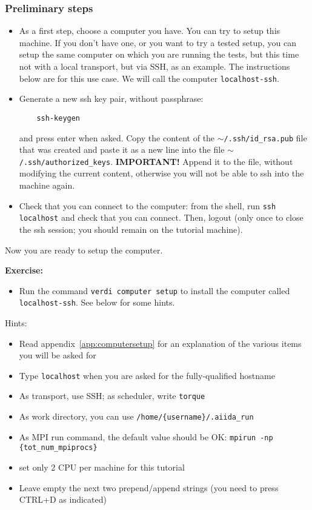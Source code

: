 \subsubsection*{Preliminary steps}
\begin{itemize}
\item As a first step, choose a computer you have. You can try to setup this machine.
If you don't have one, or you want to try a tested setup, you can setup the same computer on which
you are running the tests, but this time not with a local transport, but via SSH, as an example. The instructions below are for this use case. We will call the computer \texttt{localhost-ssh}.

\item Generate a new ssh key pair, without passphrase:
\begin{verbatim}
    ssh-keygen
\end{verbatim}
and press enter when asked. 
Copy the content of the \texttt{$\sim$/.ssh/id\_rsa.pub} file that was created and 
paste it as a new line into the file \texttt{$\sim$/.ssh/authorized\_keys}. \textbf{IMPORTANT!}
Append it to the file, without modifying the current content, otherwise you will 
not be able to ssh into the machine again.

\item Check that you can connect to the computer: from the shell, run \texttt{ssh localhost} and check that you can connect. Then, logout (only once to close the ssh session;
you should remain on the tutorial machine).
\end{itemize}

Now you are ready to setup the computer.

\begin{tcolorbox}
\textbf{Exercise:}
\begin{itemize}
\item Run the command \texttt{verdi computer setup} to install the computer called \texttt{localhost-ssh}. See below for some hints.
\end{itemize}
\end{tcolorbox}

Hints:
\begin{itemize}
\item Read appendix~\ref{app:computersetup} for an explanation of the various items you will be asked for
\item Type \texttt{localhost} when you are asked for the fully-qualified hostname
\item As transport, use SSH; as scheduler, write \texttt{torque}
\item As work directory, you can use \texttt{/home/\{username\}/.aiida\_run}
\item As MPI run command, the default value should be OK: \texttt{mpirun -np \{tot\_num\_mpiprocs\}}
\item set only 2 CPU per machine for this tutorial
\item Leave empty the next two prepend/append strings (you need to press CTRL+D as indicated)
\end{itemize}

